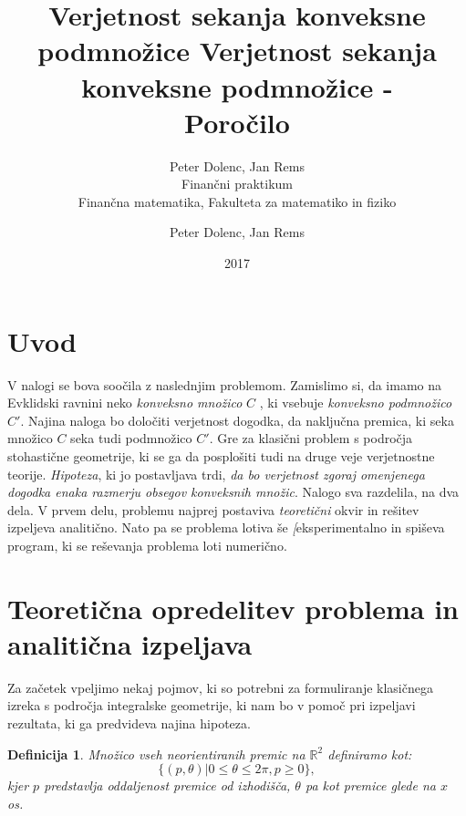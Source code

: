 \documentclass[a4paper]{article}
\title{Verjetnost sekanja konveksne podmnožice}
\author{Peter Dolenc, Jan Rems \\ Finančni praktikum \\ Finančna matematika, Fakulteta za matematiko in fiziko}
\date{2017}
\newtheorem{definicija}{Definicija}
\begin{document}
\title{%
  Verjetnost sekanja konveksne podmnožice -\\
   \large Poročilo \\}

\author{Peter Dolenc, Jan Rems}

\maketitle

\pagebreak

\section{Uvod}


V nalogi se bova soočila z naslednjim problemom. Zamislimo si, da imamo na Evklidski ravnini neko \textit{konveksno množico} $C$ , ki vsebuje \textit{konveksno podmnožico } $C'$. Najina naloga bo določiti verjetnost dogodka, da naključna premica, ki seka množico $C$ seka tudi podmnožico $C'$. Gre za klasični problem s področja stohastične geometrije, ki se ga da posplošiti tudi na druge veje verjetnostne teorije. \textit{Hipoteza}, ki jo postavljava trdi, \textit{da bo verjetnost zgoraj omenjenega dogodka enaka razmerju obsegov konveksnih množic}. Nalogo sva razdelila, na dva dela. V prvem delu, problemu najprej postaviva \textit{teoretični}  okvir in rešitev izpeljeva analitično. Nato pa se problema lotiva še \textit[{eksperimentalno} in spiševa program, ki se reševanja problema loti numerično.


\vspace{4 mm}


\section{Teoretična opredelitev problema in analitična izpeljava}

Za začetek vpeljimo nekaj pojmov, ki so potrebni za formuliranje klasičnega izreka s področja integralske geometrije, ki nam bo v pomoč pri izpeljavi rezultata, ki ga predvideva najina hipoteza.

\begin{definicija}\label{def:1}
Množico vseh neorientiranih premic na $\mathbb{R}^2$ definiramo kot: $$ \{ (p,\theta)|0 \le \theta \le 2 \pi , p \ge 0\},$$ kjer $p$ predstavlja oddaljenost premice od izhodišča, $\theta$ pa kot premice glede na $x$ os.
\end{definicija}

\vspace{3 mm}
\end{document}
